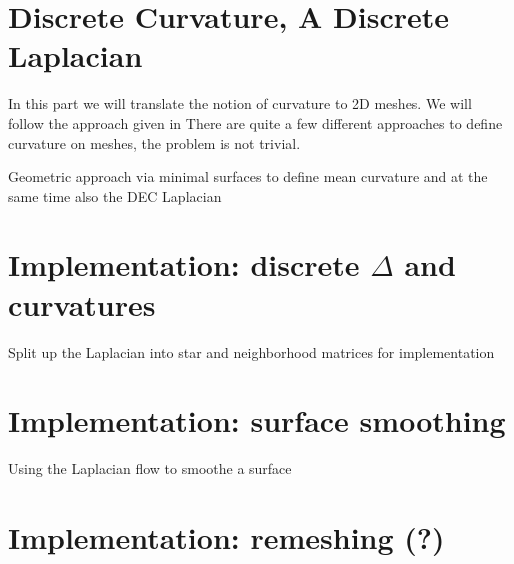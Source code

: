 
\section{Discrete Curvature, A Discrete Laplacian}
In this part we will translate the notion of curvature to 2D meshes. We will follow the approach given in  There are quite a few different approaches to define curvature on meshes, the problem is not trivial. 



Geometric approach via minimal surfaces to define mean curvature and at the same time also the DEC Laplacian
		
\section{Implementation: discrete $\Delta$ and curvatures}
Split up the Laplacian into star and neighborhood matrices for implementation

\section{Implementation: surface smoothing}
Using the Laplacian flow to smoothe a surface

\section{Implementation: remeshing (?)}
